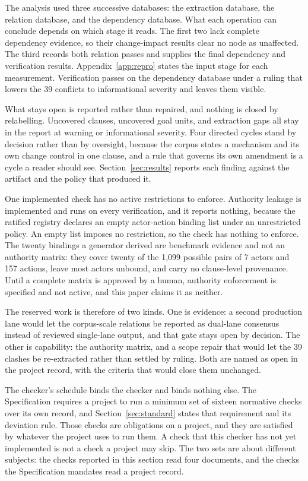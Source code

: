 The analysis used three successive databases: the extraction database, the relation database, and the dependency database. What each operation can conclude depends on which stage it reads. The first two lack complete dependency evidence, so their change-impact results clear no node as unaffected. The third records both relation passes and supplies the final dependency and verification results. Appendix~\ref{app:repro} states the input stage for each measurement. Verification passes on the dependency database under a ruling that lowers the 39 conflicts to informational severity and leaves them visible.

What stays open is reported rather than repaired, and nothing is closed by relabelling. Uncovered clauses, uncovered goal units, and extraction gaps all stay in the report at warning or informational severity. Four directed cycles stand by decision rather than by oversight, because the corpus states a mechanism and its own change control in one clause, and a rule that governs its own amendment is a cycle a reader should see. Section~\ref{sec:results} reports each finding against the artifact and the policy that produced it.

One implemented check has no active restrictions to enforce. Authority leakage is implemented and runs on every verification, and it reports nothing, because the ratified registry declares an empty actor-action binding list under an unrestricted policy. An empty list imposes no restriction, so the check has nothing to enforce. The twenty bindings a generator derived are benchmark evidence and not an authority matrix: they cover twenty of the 1{,}099 possible pairs of 7 actors and 157 actions, leave most actors unbound, and carry no clause-level provenance. Until a complete matrix is approved by a human, authority enforcement is specified and not active, and this paper claims it as neither.

The reserved work is therefore of two kinds. One is evidence: a second production lane would let the corpus-scale relations be reported as dual-lane consensus instead of reviewed single-lane output, and that gate stays open by decision. The other is capability: the authority matrix, and a scope repair that would let the 39 clashes be re-extracted rather than settled by ruling. Both are named as open in the project record, with the criteria that would close them unchanged.

The checker's schedule binds the checker and binds nothing else. The Specification requires a project to run a minimum set of sixteen normative checks over its own record, and Section~\ref{sec:standard} states that requirement and its deviation rule. Those checks are obligations on a project, and they are satisfied by whatever the project uses to run them. A check that this checker has not yet implemented is not a check a project may skip. The two sets are about different subjects: the checks reported in this section read four documents, and the checks the Specification mandates read a project record.


